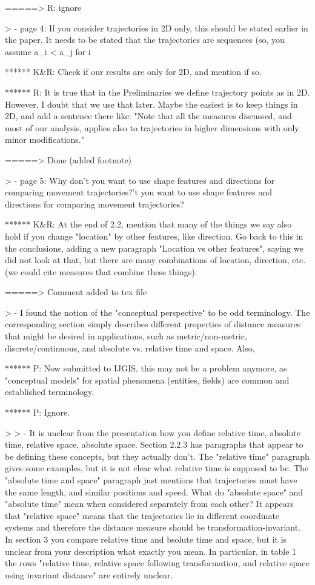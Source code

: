 =====> R: ignore

> - page 4: If you consider trajectories in 2D only, this should be stated earlier in the paper. It needs to be stated that the trajectories are sequences (so, you assume a_i < a_j for i

******  K&R: Check if our results are only for 2D, and mention if so.

****** R: It is true that in the Preliminaries we define trajectory points as in 2D. However, I doubt that we use that later. Maybe the easiest is to keep things in 2D, and add a sentence there like: "Note that all the measures discussed, and most of our analysis, applies also to trajectories in higher dimensions with only minor modifications."

=====> Done (added footnote)


> - page 5: Why don't you want to use shape features and directions for comparing movement trajectories?'t you want to use shape features and directions for comparing movement trajectories?

****** K&R: At the end of 2.2, mention that many of the things we say also hold if you change "location" by other features, like direction. Go back to this in the conclusions, adding a new paragraph "Location vs other features", saying we did not look at that, but there are many combinations of location, direction, etc. (we could cite measures that combine these things).

=====> Comment added to tex file


> - I found the notion of the "conceptual perspective" to be odd terminology. The corresponding section simply describes different properties of distance measures that might be desired in applications, such as metric/non-metric, discrete/continuous, and absolute vs. relative time and space. Also,

****** P: Now submitted to IJGIS, this may not be a problem anymore, as "conceptual models" for spatial phenomena (entities, fields) are common and established terminology.

****** P: Ignore.

>
> - It is unclear from the presentation how you define relative time, absolute time, relative space, absolute space. Section 2.2.3 has paragraphs that appear to be defining these concepts, but they actually don't. The "relative time" paragraph gives some examples, but it is not clear what relative time is supposed to be. The "absolute time and space" paragraph just mentions that trajectories must have the same length, and similar positions and speed. What do "absolute space" and "absolute time" mean when considered separately from each other? It appears that "relative space" means that the trajectories lie in different coordinate systems and therefore the distance measure should be transformation-invariant. In section 3 you compare relative time and bsolute time and space, but it is unclear from your description what exactly you mean. In particular, in table 1 the rows "relative time, relative space following transformation, and relative space using invariant distance" are entirely unclear.

